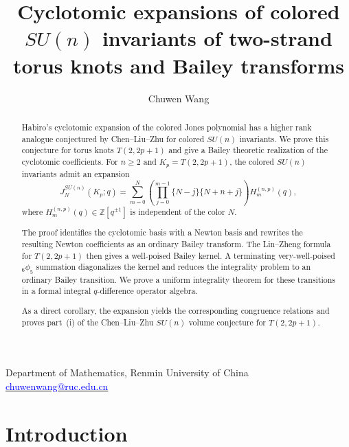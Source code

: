 \documentclass[11pt]{amsart}
\title[Cyclotomic expansions via Bailey transforms]
{Cyclotomic expansions of colored $SU(n)$ invariants of two-strand torus knots and Bailey transforms}
\author{Chuwen Wang}
\begin{document}
\maketitle

\vspace{-1.8em}
\begin{center}
{\small Department of Mathematics, Renmin University of China}\\[-2pt]
{\small
\href{mailto:chuwenwang@ruc.edu.cn}
{\textcolor{blue}{chuwenwang@ruc.edu.cn}}
}
\end{center}
\vspace{1em}




\begin{abstract}
Habiro's cyclotomic expansion of the colored Jones polynomial has a
higher rank analogue conjectured by Chen--Liu--Zhu for colored
\(SU(n)\) invariants.  We prove this conjecture for torus
knots \(T(2,2p+1)\) and give a Bailey theoretic realization of the
cyclotomic coefficients.  For \(n\geq2\) and
\(K_p=T(2,2p+1)\), the colored $SU(n)$ invariants admit an
expansion
\[
J_N^{SU(n)}(K_p;q)
=
\sum_{m=0}^{N}
\left(\prod_{j=0}^{m-1}\{N-j\}\{N+n+j\}\right)
H_m^{(n,p)}(q),
\]
where \(H_m^{(n,p)}(q)\in\mathbb Z[q^{\pm1}]\) is independent of the
color \(N\).

The proof identifies the cyclotomic basis with a Newton basis and rewrites the resulting Newton coefficients as an ordinary Bailey transform. 
The Lin--Zheng formula for \(T(2,2p+1)\) then gives a well-poised Bailey kernel.
A terminating very-well-poised \({}_6\phi_5\) summation diagonalizes the kernel and reduces the integrality problem to an ordinary Bailey transition. 
We prove a uniform integrality theorem for these transitions in a formal integral \(q\)-difference operator algebra.

As a direct corollary, the expansion yields the corresponding congruence
relations and proves part~{\rm (i)} of the Chen--Liu--Zhu
\(SU(n)\) volume conjecture for \(T(2,2p+1)\).

\end{abstract}





\setcounter{tocdepth}{2}
{\hypersetup{linkcolor=blue}\tableofcontents}

\section{Introduction}
\label{sec:introduction}
\end{document}
